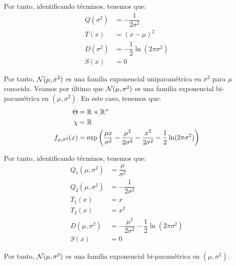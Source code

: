 \begin{ejemplo}
    Por tanto, identificando términos, tenemos que:
    \begin{align*}
        Q(\sigma^2) &= -\dfrac{1}{2\sigma^2} \\
        T(x) &= (x-\mu)^2 \\
        D(\sigma^2) &= -\dfrac{1}{2}\ln(2\pi\sigma^2) \\
        S(x) &= 0
    \end{align*}

    Por tanto, $\mathcal{N}(\mu, \sigma^2)$ es una familia exponencial uniparamétrica en $\sigma^2$ para $\mu$ conocida. Veamos por último que $\mathcal{N}(\mu, \sigma^2)$ es una familia exponencial bi-paramétrica en $(\mu, \sigma^2)$. En este caso, tenemos que:
    \begin{align*}
        \Theta &= \mathbb{R}\times\mathbb{R}^+ \\
        \chi &= \mathbb{R} \\
        f_{\mu, \sigma^2}(x) &= \exp\left(\dfrac{\mu x}{\sigma^2} - \dfrac{\mu^2}{2\sigma^2} - \dfrac{x^2}{2\sigma^2} - \dfrac{1}{2}\ln(2\pi\sigma^2)\right)
    \end{align*}

    Por tanto, identificando términos, tenemos que:
    \begin{align*}
        Q_1(\mu, \sigma^2) &= \dfrac{\mu}{\sigma^2} \\
        Q_2(\mu, \sigma^2) &= -\dfrac{1}{2\sigma^2} \\
        T_1(x) &= x \\
        T_2(x) &= x^2 \\
        D(\mu, \sigma^2) &= -\dfrac{\mu^2}{2\sigma^2} - \dfrac{1}{2}\ln(2\pi\sigma^2) \\
        S(x) &= 0
    \end{align*}

    Por tanto, $\mathcal{N}(\mu, \sigma^2)$ es una familia exponencial bi-paramétrica en $(\mu, \sigma^2)$.
\end{ejemplo}

